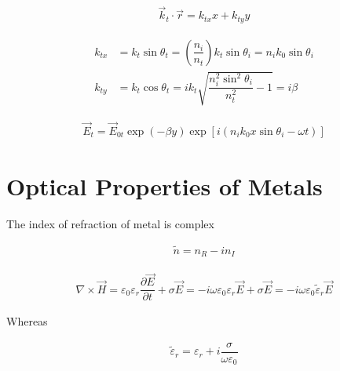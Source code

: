 \begin{equation*}
  \begin{aligned}
    \vec{k}_t \cdot \vec{r} = k_{tx} x + k_{ty} y
  \end{aligned}
\end{equation*}

\begin{equation*}
  \begin{aligned}
    k_{tx} &= k_t \sin \theta_t = \left( \dfrac{n_i}{n_t}  \right) k_t \sin \theta_i = n_i k_0 \sin \theta_i \\
    k_{ty} &= k_t \cos \theta_t = i k_t \sqrt{\dfrac{n_i^2 \sin^2 \theta_i}{n_t^2} - 1} = i \beta
  \end{aligned}
\end{equation*}

\begin{equation*}
  \begin{aligned}
    \vec{E}_t = \vec{E}_{0t} \exp \left( - \beta y \right) \exp \left[ i \left( n_i k_0 x \sin \theta_i - \omega t \right) \right]
  \end{aligned}
\end{equation*}

\section{Optical Properties of Metals}

The index of refraction of metal is complex

\begin{equation*}
  \begin{aligned}
    \tilde{n} = n_R - i n_I
  \end{aligned}
\end{equation*}

\begin{equation*}
  \begin{aligned}
    \nabla \times \vec{H} = \varepsilon_0 \varepsilon_r \dfrac{\partial \vec{E}}{\partial t} + \sigma \vec{E} = - i \omega \varepsilon_0 \varepsilon_r \vec{E} + \sigma \vec{E} = - i \omega \varepsilon_0 \tilde{\varepsilon}_r \vec{E}
  \end{aligned}
\end{equation*}

Whereas

\begin{equation*}
  \begin{aligned}
    \tilde{\varepsilon}_r = \varepsilon_r + i \dfrac{\sigma}{\omega \varepsilon_0} 
  \end{aligned}
\end{equation*}

